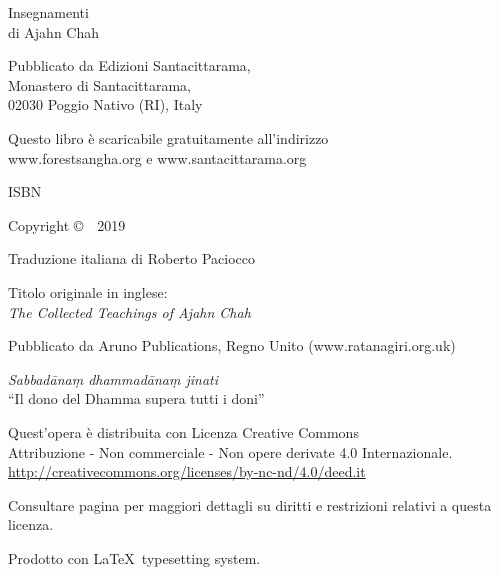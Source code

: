\cleartoverso
\thispagestyle{empty}

{\copyrightsize
\centering
\setlength{\parindent}{0pt}%
\setlength{\parskip}{0.8\baselineskip}%

Insegnamenti\\
di Ajahn Chah

Pubblicato da Edizioni Santacittarama,\\
Monastero di Santacittarama,\\
02030 Poggio Nativo (RI), Italy

Questo libro è scaricabile gratuitamente all'indirizzo\\
www.forestsangha.org e www.santacittarama.org

ISBN \theISBN

Copyright \copyright\ \thePublisher\ 2019

Traduzione italiana di Roberto Paciocco

Titolo originale in inglese:\\
\emph{The Collected Teachings of Ajahn Chah}

Pubblicato da Aruno Publications, Regno Unito (www.ratanagiri.org.uk)

\emph{Sabbadānaṃ dhammadānaṃ jinati}\\
``Il dono del Dhamma supera tutti i doni''

\vfill

{\footnotesize
Quest'opera è distribuita con Licenza Creative Commons\\
Attribuzione - Non commerciale - Non opere derivate 4.0 Internazionale.\\
\href{http://creativecommons.org/licenses/by-nc-nd/4.0/deed.it}{http://creativecommons.org/licenses/by-nc-nd/4.0/deed.it}

Consultare pagina \pageref{copyright-details} per maggiori dettagli su diritti e restrizioni relativi a questa licenza.

Prodotto con \LaTeX\ typesetting system.


\theEditionInfo

}}
